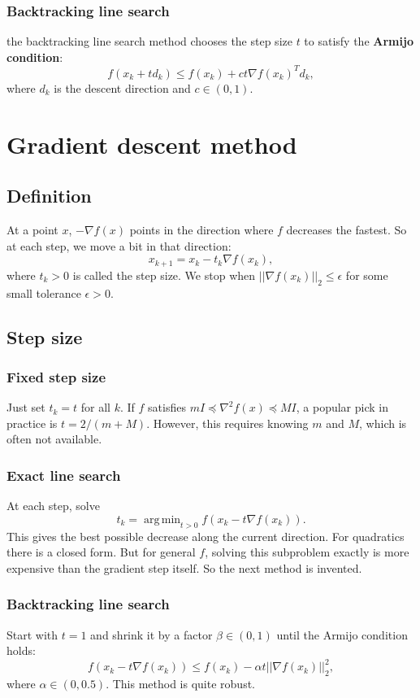\documentclass[lang=en,color=blue,mode=fancy,titlestyle=hang]{elegantbook}
\DeclareMathOperator*{\argmin}{arg\,min}
\begin{document}
\subsubsection{Backtracking line search} the backtracking line search method chooses the step
size $t$ to satisfy the \textbf{Armijo condition}:
\[
f(x_k + t d_k) \leq f(x_k) + c t \nabla f(x_k)^T d_k,
\]
where $d_k$ is the descent direction and $c \in (0, 1)$.

\section{Gradient descent method}
\subsection{Definition}
At a point $x$, $-\nabla f(x)$ points in the direction where $f$ decreases the fastest. So at each step, we move
a bit in that direction:
\begin{equation}
x_{k+1} = x_k - t_k \nabla f(x_k),
\end{equation}
where $t_k > 0$ is called the step size. We stop when $||\nabla f(x_k)||_2 \leq \epsilon$
for some small tolerance $\epsilon > 0$.

\subsection{Step size}
\subsubsection{Fixed step size} Just set $t_k = t$ for all $k$. If $f$ satisfies
$m I \preceq \nabla^2 f(x) \preceq M I$, a popular pick in practice is $t = 2/(m + M)$. However,
this requires knowing $m$ and $M$, which is often not available.

\subsubsection{Exact line search} At each step, solve
\[
t_k = \argmin_{t > 0} f(x_k - t \nabla f(x_k)).
\]
This gives the best possible decrease along the current direction. For quadratics
there is a closed form. But for general $f$, solving this subproblem exactly is
more expensive than the gradient step itself. So the next method is invented.

\subsubsection{Backtracking line search} Start with $t = 1$ and shrink it by a factor
$\beta \in (0, 1)$ until the Armijo condition holds:
\[
f(x_k - t \nabla f(x_k)) \leq f(x_k) - \alpha t ||\nabla f(x_k)||_2^2,
\]
where $\alpha \in (0, 0.5)$. This method is quite robust.
\end{document}
